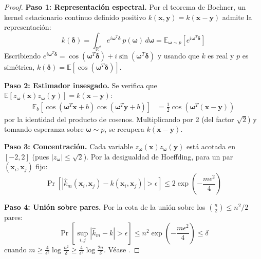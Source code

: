 \begin{proof}
\textbf{Paso 1: Representación espectral.} Por el teorema de Bochner, un kernel estacionario continuo definido positivo $k(\mathbf{x}, \mathbf{y}) = k(\mathbf{x} - \mathbf{y})$ admite la representación:
\[
k(\boldsymbol{\delta}) = \int_{\mathbb{R}^d} e^{i\boldsymbol{\omega}^T \boldsymbol{\delta}} \, p(\boldsymbol{\omega}) \, d\boldsymbol{\omega} = \mathbb{E}_{\boldsymbol{\omega} \sim p}\!\left[e^{i\boldsymbol{\omega}^T \boldsymbol{\delta}}\right]
\]
Escribiendo $e^{i\boldsymbol{\omega}^T \boldsymbol{\delta}} = \cos(\boldsymbol{\omega}^T \boldsymbol{\delta}) + i\sin(\boldsymbol{\omega}^T \boldsymbol{\delta})$ y usando que $k$ es real y $p$ es simétrica, $k(\boldsymbol{\delta}) = \mathbb{E}[\cos(\boldsymbol{\omega}^T \boldsymbol{\delta})]$.

\textbf{Paso 2: Estimador insesgado.} Se verifica que $\mathbb{E}[z_{\boldsymbol{\omega}}(\mathbf{x}) z_{\boldsymbol{\omega}}(\mathbf{y})] = k(\mathbf{x} - \mathbf{y})$:
\begin{align}
\mathbb{E}_{b}[\cos(\boldsymbol{\omega}^T\mathbf{x}+b)\cos(\boldsymbol{\omega}^T\mathbf{y}+b)] &= \frac{1}{2}\cos(\boldsymbol{\omega}^T(\mathbf{x}-\mathbf{y}))
\end{align}
por la identidad del producto de cosenos. Multiplicando por 2 (del factor $\sqrt{2}$) y tomando esperanza sobre $\boldsymbol{\omega} \sim p$, se recupera $k(\mathbf{x}-\mathbf{y})$.

\textbf{Paso 3: Concentración.} Cada variable $z_{\boldsymbol{\omega}}(\mathbf{x}) z_{\boldsymbol{\omega}}(\mathbf{y})$ está acotada en $[-2, 2]$ (pues $|z_{\boldsymbol{\omega}}| \leq \sqrt{2}$). Por la desigualdad de Hoeffding, para un par $(\mathbf{x}_i, \mathbf{x}_j)$ fijo:
\[
\Pr\!\left[|\hat{k}_m(\mathbf{x}_i, \mathbf{x}_j) - k(\mathbf{x}_i, \mathbf{x}_j)| > \epsilon\right] \leq 2\exp\!\left(-\frac{m\epsilon^2}{4}\right)
\]

\textbf{Paso 4: Unión sobre pares.} Por la cota de la unión sobre los $\binom{n}{2} \leq n^2/2$ pares:
\[
\Pr\!\left[\sup_{i,j} |\hat{k}_m - k| > \epsilon\right] \leq n^2 \exp\!\left(-\frac{m\epsilon^2}{4}\right) \leq \delta
\]
cuando $m \geq \frac{4}{\epsilon^2}\log\frac{n^2}{\delta} \geq \frac{4}{\epsilon^2}\log\frac{2n}{\delta}$. Véase \citep{rahimi2007random}.
\end{proof}
